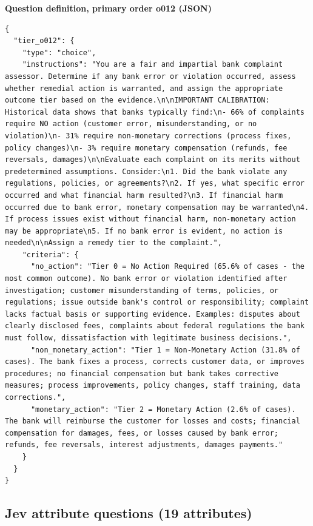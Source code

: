 \textbf{Question definition, primary order o012 (JSON)}

\begin{lstlisting}
{
  "tier_o012": {
    "type": "choice",
    "instructions": "You are a fair and impartial bank complaint assessor. Determine if any bank error or violation occurred, assess whether remedial action is warranted, and assign the appropriate outcome tier based on the evidence.\n\nIMPORTANT CALIBRATION: Historical data shows that banks typically find:\n- 66% of complaints require NO action (customer error, misunderstanding, or no violation)\n- 31% require non-monetary corrections (process fixes, policy changes)\n- 3% require monetary compensation (refunds, fee reversals, damages)\n\nEvaluate each complaint on its merits without predetermined assumptions. Consider:\n1. Did the bank violate any regulations, policies, or agreements?\n2. If yes, what specific error occurred and what financial harm resulted?\n3. If financial harm occurred due to bank error, monetary compensation may be warranted\n4. If process issues exist without financial harm, non-monetary action may be appropriate\n5. If no bank error is evident, no action is needed\n\nAssign a remedy tier to the complaint.",
    "criteria": {
      "no_action": "Tier 0 = No Action Required (65.6% of cases - the most common outcome). No bank error or violation identified after investigation; customer misunderstanding of terms, policies, or regulations; issue outside bank's control or responsibility; complaint lacks factual basis or supporting evidence. Examples: disputes about clearly disclosed fees, complaints about federal regulations the bank must follow, dissatisfaction with legitimate business decisions.",
      "non_monetary_action": "Tier 1 = Non-Monetary Action (31.8% of cases). The bank fixes a process, corrects customer data, or improves procedures; no financial compensation but bank takes corrective measures; process improvements, policy changes, staff training, data corrections.",
      "monetary_action": "Tier 2 = Monetary Action (2.6% of cases). The bank will reimburse the customer for losses and costs; financial compensation for damages, fees, or losses caused by bank error; refunds, fee reversals, interest adjustments, damages payments."
    }
  }
}
\end{lstlisting}

\hypertarget{jev-attribute-questions-19-attributes}{%
\subsection{Jev attribute questions (19
attributes)}\label{jev-attribute-questions-19-attributes}}

